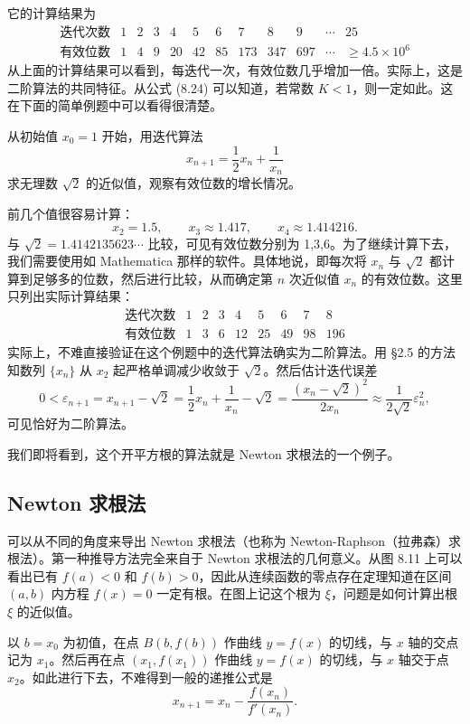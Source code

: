 它的计算结果为
\[
\begin{array}{c|ccccccccc|c|c}
\text{迭代次数}&1&2&3&4&5&6&7&8&9&\cdots&25\\\hline
\text{有效位数}&1&4&9&20&42&85&173&347&697&\cdots&\ge4.5\times10^6
\end{array}
\]
从上面的计算结果可以看到，每迭代一次，有效位数几乎增加一倍。实际上，这是二阶算法的共同特征。从公式 (8.24) 可以知道，若常数 $K<1$，则一定如此。这在下面的简单例题中可以看得很清楚。

\begin{xexample}[8.7.3]
从初始值 $x_0=1$ 开始，用迭代算法
\[
  x_{n+1}=\frac12x_n+\frac1{x_n}
\]
求无理数 $\sqrt2$ 的近似值，观察有效位数的增长情况。
\end{xexample}
\begin{xsolution}
前几个值很容易计算：
\[
  x_2=1.5,\qquad x_3\approx1.417,\qquad x_4\approx1.414216.
\]
与 $\sqrt2=1.4142135623\cdots$ 比较，可见有效位数分别为 1,3,6。为了继续计算下去，我们需要使用如 Mathematica 那样的软件。具体地说，即每次将 $x_n$ 与 $\sqrt2$ 都计算到足够多的位数，然后进行比较，从而确定第 $n$ 次近似值 $x_n$ 的有效位数。这里只列出实际计算结果：
\[
\begin{array}{c|cccccccc}
\text{迭代次数}&1&2&3&4&5&6&7&8\\\hline
\text{有效位数}&1&3&6&12&25&49&98&196
\end{array}
\]
实际上，不难直接验证在这个例题中的迭代算法确实为二阶算法。用 §2.5 的方法知数列 $\{x_n\}$ 从 $x_2$ 起严格单调减少收敛于 $\sqrt2$。然后估计迭代误差
\[
  0<\varepsilon_{n+1}=x_{n+1}-\sqrt2
  =\frac12x_n+\frac1{x_n}-\sqrt2
  =\frac{(x_n-\sqrt2)^2}{2x_n}
  \approx\frac1{2\sqrt2}\varepsilon_n^2,
\]
可见恰好为二阶算法。

我们即将看到，这个开平方根的算法就是 Newton 求根法的一个例子。
\end{xsolution}

\subsection{Newton 求根法}

可以从不同的角度来导出 Newton 求根法（也称为 Newton-Raphson（拉弗森）求根法）。第一种推导方法完全来自于 Newton 求根法的几何意义。从图 8.11 上可以看出已有 $f(a)<0$ 和 $f(b)>0$，因此从连续函数的零点存在定理知道在区间 $(a,b)$ 内方程 $f(x)=0$ 一定有根。在图上记这个根为 $\xi$，问题是如何计算出根 $\xi$ 的近似值。

以 $b=x_0$ 为初值，在点 $B(b,f(b))$ 作曲线 $y=f(x)$ 的切线，与 $x$ 轴的交点记为 $x_1$。然后再在点 $(x_1,f(x_1))$ 作曲线 $y=f(x)$ 的切线，与 $x$ 轴交于点 $x_2$。如此进行下去，不难得到一般的递推公式是
\begin{equation}
  x_{n+1}=x_n-\frac{f(x_n)}{f'(x_n)}.
  \tag{8.27}
  \label{eq:8.27}
\end{equation}

